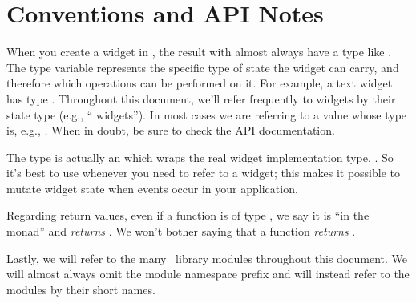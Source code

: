 \section{Conventions and API Notes}

When you create a widget in \vtyui, the result with almost always have
a type like .  The type variable  represents the
specific type of state the widget can carry, and therefore which
operations can be performed on it.  For example, a text widget has
type .  Throughout this document, we'll refer
frequently to widgets by their state type (e.g., ``
widgets''). In most cases we are referring to a value whose type is,
e.g., .  When in doubt, be sure to check the API
documentation.

The  type is actually an  which wraps the real
widget implementation type, .  So it's best to use
 whenever you need to refer to a widget; this makes it
possible to mutate widget state when events occur in your application.

Regarding return values, even if a function is of type , we say it is ``in the  monad'' and \textit{returns}
.  We won't bother saying that a function \textit{returns }.

Lastly, we will refer to the many \vtyui\ library modules throughout
this document.  We will almost always omit the
 module namespace prefix and will instead
refer to the modules by their short names.
